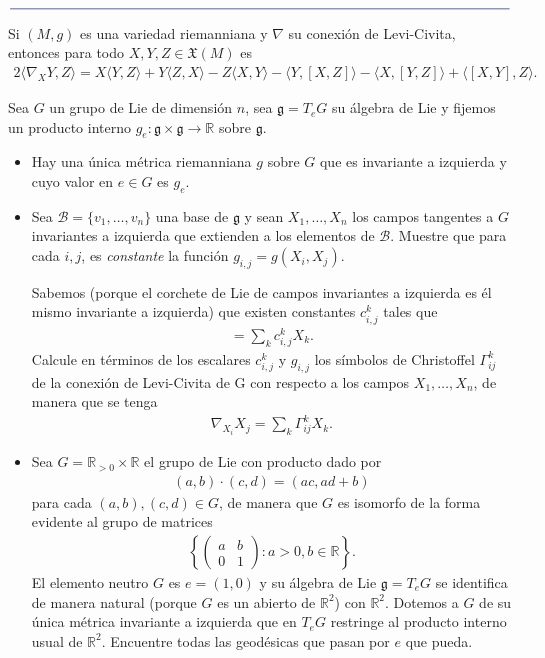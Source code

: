 \documentclass[11pt]{article}
\newcommand{\R}{\mathbb{R}}
\newcommand{\X}{\mathfrak{X}}
\newcommand{\ip}[1]{\langle #1 \rangle}
\newcommand{\paint}[1]{\color{color}{#1}}
\newcommand{\paintline}{\begin{center}
$\paint{
\rule{400pt}{0.5pt}
}$
\vspace{10pt}
\end{center}}
\newenvironment{theorem}[2][Teorema]{\begin{trivlist}
\item[\hskip \labelsep \paint{{\bfseries #1}}\hskip \labelsep {\bfseries #2.}]}{\end{trivlist}}
\newenvironment{exercise}[2][Ejercicio]{\begin{trivlist}
\item[\hskip \labelsep \paint{{\bfseries #1}}\hskip \labelsep {\bfseries #2.}]}{\end{trivlist}}
\begin{document}
\paintline

\begin{theorem}{6 (fórmula de Koszul)} Si $(M,g)$ es una variedad riemanniana y $\nabla$ su conexión de Levi-Civita, entonces para todo $X,Y,Z \in \X(M)$ es
\begin{align*}
2\ip{\nabla_XY,Z} = X\ip{Y,Z} + Y\ip{Z,X} - Z\ip{X,Y} - \ip{Y,[X,Z]} - \ip{X,[Y,Z]} + \ip{[X,Y],Z}.
\end{align*}
\end{theorem}

\begin{exercise}{5} Sea $G$ un grupo de Lie de dimensión $n$, sea $\mathfrak{g} = T_eG$ su álgebra de Lie y fijemos un producto interno $g_e : \mathfrak{g} \times \mathfrak{g} \to \R$ sobre $\mathfrak{g}$.
\begin{itemize}[listparindent = \parindent]
\item[(a)] Hay una única métrica riemanniana $g$ sobre $G$ que es invariante a izquierda y cuyo valor en $e \in G$ es $g_e$.
\item[(b)] Sea $\mathscr{B} = \{v_1, \dots, v_n\}$ una base de $\mathfrak{g}$ y sean $X_1, \dots, X_n$ los campos tangentes a $G$ invariantes a izquierda que extienden a los elementos de $\mathscr{B}$. Muestre que para cada $i,j$, es \textit{constante} la función $g_{i,j} = g(X_i,X_j)$.

Sabemos (porque el corchete de Lie de campos invariantes a izquierda es él mismo invariante a izquierda) que existen constantes $c_{i,j}^k$ tales que
\begin{align*}
[X_i,X_j] = \sum_{k}c_{i,j}^kX_k.
\end{align*}
Calcule en términos de los escalares $c_{i,j}^k$ y $g_{i,j}$ los símbolos de Christoffel $\Gamma_{ij}^k$ de la conexión de Levi-Civita de G con respecto a los campos $X_1, \dots, X_n$, de manera que se tenga
\begin{align*}
\nabla_{X_i}X_j = \sum_k\Gamma_{ij}^kX_k.
\end{align*}
\item[(c)] Sea $G = \R_{>0 } \times \R$ el grupo de Lie con producto dado por
\begin{align*}
(a,b) \cdot (c,d) = (ac,ad+b)
\end{align*}
para cada $(a,b),(c,d) \in G$, de manera que $G$ es isomorfo de la forma evidente al grupo de matrices 
\begin{align*}
\left\{\begin{pmatrix}
a & b \\
0 & 1
\end{pmatrix} : a >0, b \in \R\right\}.
\end{align*}
El elemento neutro $G$ es $e = (1,0)$ y su álgebra de Lie $\mathfrak{g} = T_eG$ se identifica de manera natural (porque $G$ es un abierto de $\R^2$) con $\R^2$. Dotemos a $G$ de su única métrica invariante a izquierda que en $T_eG$ restringe al producto interno usual de $\R^2$. Encuentre todas las geodésicas que pasan por $e$ que pueda.


\end{itemize}
\end{exercise}
\end{document}
